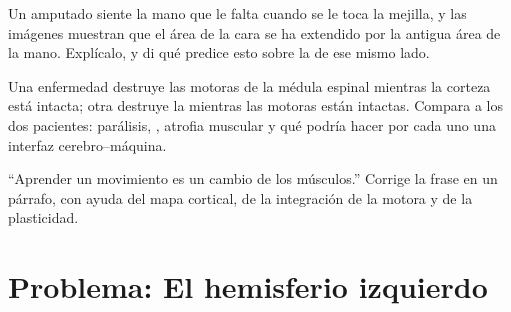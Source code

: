 \begin{exercise}[$\star\star\star$]\label{exo:g12:brain-and-movement:13}
Un amputado siente la mano que le falta cuando se le toca la mejilla, y
las imágenes muestran que el área de la cara se ha extendido por la
antigua área de la mano. Explícalo, y di qué predice esto sobre la
 de ese mismo lado.
\end{exercise}

\begin{exercise}[$\star\star\star$]\label{exo:g12:brain-and-movement:14}
Una enfermedad destruye las  motoras de la médula espinal
mientras la corteza está intacta; otra destruye la 
mientras las  motoras están intactas. Compara a los dos
pacientes: parálisis, , atrofia muscular y qué podría hacer por
cada uno una interfaz cerebro--máquina.
\end{exercise}

\begin{exercise}[$\star\star\star$]\label{exo:g12:brain-and-movement:15}
``Aprender un movimiento es un cambio de los músculos.'' Corrige la
frase en un párrafo, con ayuda del mapa cortical, de la integración de
la  motora y de la plasticidad.
\end{exercise}

\section{Problema: El hemisferio izquierdo}

